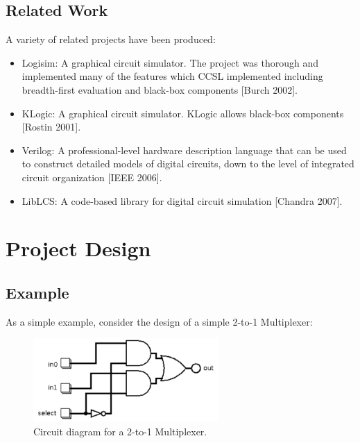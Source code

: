 \documentclass{article}
\begin{document}
\subsection{Related Work}

A variety of related projects have been produced:

\begin{itemize}

\item Logisim: A graphical circuit simulator. The project was thorough and implemented many of the features which CCSL implemented including breadth-first evaluation and black-box components [Burch 2002].

\item KLogic: A graphical circuit simulator. KLogic allows black-box components [Rostin 2001].

\item Verilog: A professional-level hardware description language that can be used to construct detailed models of digital circuits, down to the level of integrated circuit organization [IEEE 2006].

\item LibLCS: A code-based library for digital circuit simulation [Chandra 2007].

\end{itemize}

\section{Project Design}

\subsection{Example}

As a simple example, consider the design of a simple 2-to-1 Multiplexer:

\begin{figure}[H]
    \begin{center}
        \includegraphics[angle=0,width=200pt]{imgs/Mux.pdf}
    \end{center}
    \caption{Circuit diagram for a 2-to-1 Multiplexer.}
\end{figure}
\end{document}

